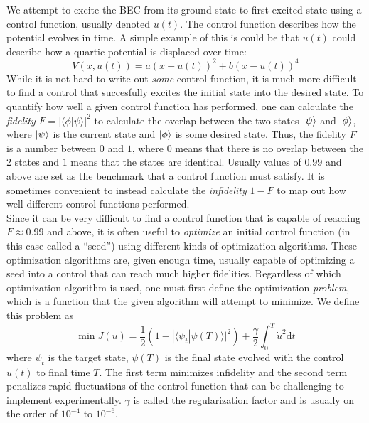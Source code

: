 \documentclass[a4paper, twocolumn]{revtex4-1}
\begin{document}
We attempt to excite the BEC from its ground state to first excited state using a control function, usually denoted $u(t)$. The control function describes how the potential evolves in time. A simple example of this is could be that $u(t)$ could describe how a quartic potential is displaced over time:
\begin{equation}
	V(x, u(t)) = a(x-u(t))^2 + b(x-u(t))^4
\end{equation}
While it is not hard to write out \textit{some} control function, it is much more difficult to find a control that succesfully excites the initial state into the desired state. To quantify how well a given control function has performed, one can calculate the \textit{fidelity} $F = | \langle \phi | \psi \rangle |^2$ to calculate the overlap between the two states $\ket{\psi}$ and $\ket{\phi}$, where $\ket{\psi}$ is the current state and $\ket{\phi}$ is some desired state. Thus, the fidelity $F$ is a number between $0$ and $1$, where $0$ means that there is no overlap between the 2 states and $1$ means that the states are identical. Usually values of $0.99$ and above are set as the benchmark that a control function must satisfy. It is sometimes convenient to instead calculate the \textit{infidelity} $1-F$ to map out how well different control functions performed.\\

Since it can be very difficult to find a control function that is capable of reaching $F\approx 0.99$ and above, it is often useful to \textit{optimize} an initial control function (in this case called a ``seed'') using different kinds of optimization algorithms. These optimization algorithms are, given enough time, usually capable of optimizing a seed into a control that can reach much higher fidelities. Regardless of which optimization algorithm is used, one must first define the optimization \textit{problem}, which is a function that the given algorithm will attempt to minimize. We define this problem as\cite{JensJacobPhDThesis} 
\begin{equation}
	\min J(u) = \frac{1}{2}(1-| \langle \psi_{t} | \psi(T) \rangle|^2) + \frac{\gamma}{2} \int_{0}^{T} \dot{u}^2 \text{d}t
\end{equation}
where $\psi_{t}$ is the target state, $\psi(T)$ is the final state evolved with the control $u(t)$ to final time $T$. The first term minimizes infidelity and the second term penalizes rapid fluctuations of the control function that can be challenging to implement experimentally. $\gamma$ is called the regularization factor and is usually on the order of $10^{-4}$ to $10^{-6}$. \\
\end{document}
